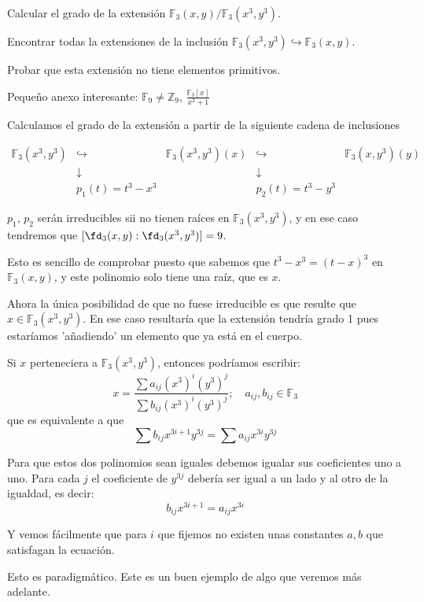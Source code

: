 \begin{problem}[3]

\ppart Calcular el grado de la extensión $\mathbb{F}_3(x, y)/\mathbb{F}_3(x^3, y^3)$.

\ppart Encontrar todas la extensiones de la inclusión $\mathbb{F}_3 (x^3 , y^3) \hookrightarrow \mathbb{F}_3(x, y)$.

\ppart Probar que esta extensión no tiene elementos primitivos.

\solution

Pequeño anexo interesante: $\mathbb{F}_9 ≠ ℤ_9$, $\frac{\mathbb{F}_3[x]}{x^2+1}$

\spart Calculamos el grado de la extensión a partir de la siguiente cadena de inclusiones

\[
\begin{array}{ccccc}
\mathbb{F}_3(x^3,y^3) & \hookrightarrow
	& \mathbb{F}_3(x^3,y^3)(x) & \hookrightarrow
	& \mathbb{F}_3(x,y^3)(y) \\
& \downarrow & & \downarrow & \\
& p_1(t) = t^3-x^3 & & p_2(t) = t^3-y^3 &
\end{array}
\]

$p_1$, $p_2$ serán irreducibles sii no tienen raíces en $\mathbb{F}_3(x^3,y^3)$, y en ese caso tendremos que $[\fd_3(x,y): \fd_3(x^3,y^3)] = 9$.

Esto es sencillo de comprobar puesto que sabemos que $t^3-x^3 = (t-x)^3$ en $\mathbb{F}_3(x,y)$, y este polinomio solo tiene una raíz, que es $x$.

Ahora la única posibilidad de que no fuese irreducible es que resulte que $x\in \mathbb{F}_3(x^3,y^3)$. En ese caso resultaría que la extensión tendría grado 1 pues estaríamos 'añadiendo' un elemento que ya está en el cuerpo.

Si $x$ perteneciera a $\mathbb{F}_3(x^3,y^3)$, entonces podríamos escribir:
\[x = \frac{\sum a_{ij}(x^3)^i(y^3)^j}{\sum b_{ij}(x^3)^i(y^3)^j}; \quad a_{ij},b_{ij} ∈ \mathbb{F}_3\] que es equivalente a que
\[ \sum b_{ij} x^{3i+1}y^{3j} = \sum a_{ij} x^{3i}y^{3j}\]

Para que estos dos polinomios sean iguales debemos igualar sus coeficientes uno a uno. Para cada $j$ el coeficiente de $y^{3j}$ debería ser igual a un lado y al otro de la igualdad, es decir:
\[b_{ij}x^{3i+1}=a_{ij}x^{3i}\]

Y vemos fácilmente que para $i$ que fijemos no existen unas constantes $a,b$ que satisfagan la ecuación.

\spart Esto es paradigmático. Este es un buen ejemplo de algo que veremos más adelante.


\end{problem}
